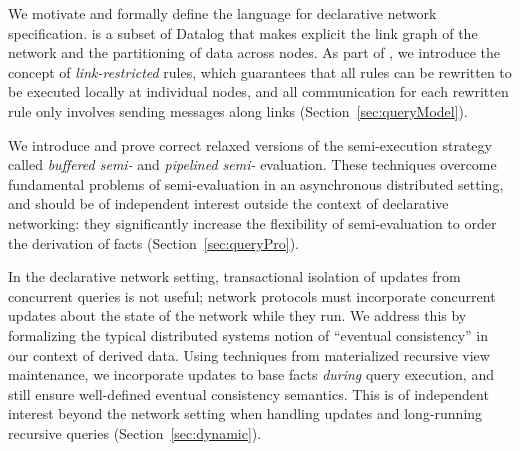 \begin{mylist}

\item We motivate and formally define the \Dlog language for
  declarative network specification.  \Dlog is a subset of Datalog
  that makes explicit the link graph of the network and
  the partitioning of data across nodes.  As part of \Dlog, we
  introduce the concept of {\em link-restricted} rules, which guarantees
  that all rules can be rewritten to be executed locally at individual nodes, and all
  communication for each rewritten rule only involves sending messages
  along links (Section~\ref{sec:queryModel}). 

\item We introduce and prove correct relaxed versions of the
      semi-\naive execution strategy called {\em buffered
      semi-\naive} and {\em
      pipe\-lined semi-\naive} evaluation.  These techniques overcome
      fundamental problems of semi-\naive evaluation in an asynchro\-nous
      distributed setting, and should be of independent interest outside the context of declarative
      networking: they significantly increase the flexibility of
      semi-\naive evaluation to order the derivation of facts
      (Section~\ref{sec:queryPro}).

\item In the declarative network setting, transactional isolation of updates from
      concurrent queries is not useful; network protocols must incorporate concurrent updates
      about the state of the network while they run. We address this
      by formalizing 
      the typical distributed systems notion of ``eventual consistency'' in our
      context of derived data.  Using techniques from materialized
      recursive view maintenance, we incorporate updates to base facts
      {\em 
      during} query execution, and still ensure well-defined
      eventual consistency semantics.  This is of
      independent interest beyond
      the network setting when handling updates and long-running
      recursive queries (Section~\ref{sec:dynamic}). 



\end{mylist}
